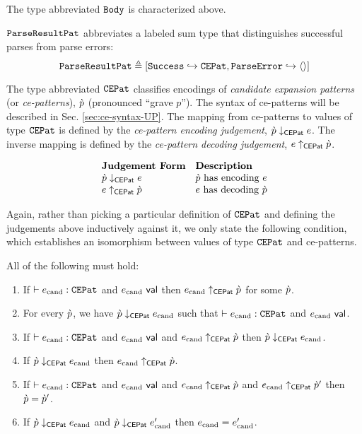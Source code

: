 {{{{\begin{enumerate}
The type abbreviated $\mathtt{Body}$ is characterized above. 

$\mathtt{ParseResultPat}$ abbreviates a labeled sum type that distinguishes successful parses from parse errors:%
\[\mathtt{ParseResultPat} \triangleq [\mathtt{Success} \hookrightarrow \mathtt{CEPat}, \mathtt{ParseError} \hookrightarrow \langle  \rangle]\] 

The type abbreviated $\mathtt{CEPat}$ classifies encodings of \emph{candidate expansion patterns} (or \emph{ce-patterns}), $\grave{p}$ (pronounced ``grave $p$''). The syntax of ce-patterns will be described in Sec. \ref{sec:ce-syntax-UP}. The mapping from ce-patterns to values of type $\mathtt{CEPat}$ is defined by the \emph{ce-pattern encoding judgement}, $\grave{p} \downarrow_\mathsf{CEPat} e$. The inverse mapping is defined by the \emph{ce-pattern decoding judgement}, $e \uparrow_\mathsf{CEPat} \grave{p}$.

\[\begin{array}{ll}
\textbf{Judgement Form} & \textbf{Description}\\
\grave{p} \downarrow_\mathsf{CEPat} e & \text{$\grave{p}$ has encoding $e$}\\
e \uparrow_\mathsf{CEPat} \grave{p} & \text{$e$ has decoding $\grave{p}$}
\end{array}\]

Again, rather than picking a particular definition of $\mathtt{CEPat}$ and defining the judgements above inductively against it, we only state the following condition, which establishes an isomorphism between values of type $\mathtt{CEPat}$ and ce-patterns.

\begin{condition} All of the following must hold:
\begin{enumerate}
\item If $\vdash e_\text{cand} : \mathtt{CEPat}$ and $e_\text{cand}~\mathsf{val}$ then $e_\text{cand} \uparrow_\mathsf{CEPat} \grave{p}$ for some $\grave{p}$.
\item For every $\grave{p}$, we have $\grave{p} \downarrow_\mathsf{CEPat} e_\text{cand}$ such that $\vdash e_\text{cand} : \mathtt{CEPat}$ and $e_\text{cand}~\mathsf{val}$.
\item If $\vdash e_\text{cand} : \mathtt{CEPat}$ and $e_\text{cand}~\mathsf{val}$ and $e_\text{cand} \uparrow_\mathsf{CEPat} \grave{p}$ then $\grave{p} \downarrow_\mathsf{CEPat} e_\text{cand}$.
\item If $\grave{p} \downarrow_\mathsf{CEPat} e_\text{cand}$ then $e_\text{cand} \uparrow_\mathsf{CEPat} \grave{p}$.
\item If $\vdash e_\text{cand} : \mathtt{CEPat}$ and $e_\text{cand}~\mathsf{val}$ and $e_\text{cand} \uparrow_\mathsf{CEPat} \grave{p}$ and $e_\text{cand} \uparrow_\mathsf{CEPat} \grave{p}'$ then $\grave{p}=\grave{p}'$.
\item If $\grave{p} \downarrow_\mathsf{CEPat} e_\text{cand}$ and $\grave{p} \downarrow_\mathsf{CEPat} e_\text{cand}'$ then $e_\text{cand}=e_\text{cand}'$.
\end{enumerate}
\end{condition}



\end{enumerate}}}}}
